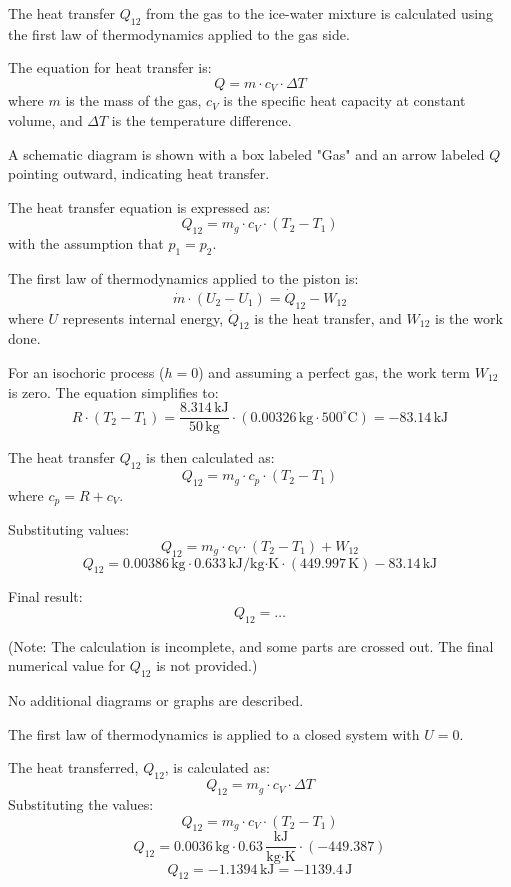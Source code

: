 The heat transfer \( Q_{12} \) from the gas to the ice-water mixture is calculated using the first law of thermodynamics applied to the gas side.  

The equation for heat transfer is:  
\[
Q = m \cdot c_V \cdot \Delta T
\]  
where \( m \) is the mass of the gas, \( c_V \) is the specific heat capacity at constant volume, and \( \Delta T \) is the temperature difference.  

A schematic diagram is shown with a box labeled "Gas" and an arrow labeled \( Q \) pointing outward, indicating heat transfer.  

The heat transfer equation is expressed as:  
\[
Q_{12} = m_g \cdot c_V \cdot (T_2 - T_1)
\]  
with the assumption that \( p_1 = p_2 \).  

The first law of thermodynamics applied to the piston is:  
\[
\dot{m} \cdot (U_2 - U_1) = \dot{Q}_{12} - W_{12}
\]  
where \( U \) represents internal energy, \( \dot{Q}_{12} \) is the heat transfer, and \( W_{12} \) is the work done.  

For an isochoric process (\( h = 0 \)) and assuming a perfect gas, the work term \( W_{12} \) is zero. The equation simplifies to:  
\[
R \cdot (T_2 - T_1) = \frac{8.314 \, \text{kJ}}{50 \, \text{kg}} \cdot (0.00326 \, \text{kg} \cdot 500^\circ\text{C}) = -83.14 \, \text{kJ}
\]  

The heat transfer \( Q_{12} \) is then calculated as:  
\[
Q_{12} = m_g \cdot c_p \cdot (T_2 - T_1)
\]  
where \( c_p = R + c_V \).  

Substituting values:  
\[
Q_{12} = m_g \cdot c_V \cdot (T_2 - T_1) + W_{12}
\]  
\[
Q_{12} = 0.00386 \, \text{kg} \cdot 0.633 \, \text{kJ/kg·K} \cdot (449.997 \, \text{K}) - 83.14 \, \text{kJ}
\]  

Final result:  
\[
Q_{12} = \ldots
\]  

(Note: The calculation is incomplete, and some parts are crossed out. The final numerical value for \( Q_{12} \) is not provided.)  

No additional diagrams or graphs are described.

The first law of thermodynamics is applied to a closed system with \( U = 0 \).  

The heat transferred, \( Q_{12} \), is calculated as:  
\[
Q_{12} = m_g \cdot c_V \cdot \Delta T
\]  
Substituting the values:  
\[
Q_{12} = m_g \cdot c_V \cdot (T_2 - T_1)
\]  
\[
Q_{12} = 0.0036 \, \text{kg} \cdot 0.63 \, \frac{\text{kJ}}{\text{kg·K}} \cdot (-449.387)
\]  
\[
Q_{12} = -1.1394 \, \text{kJ} = -1139.4 \, \text{J}
\]